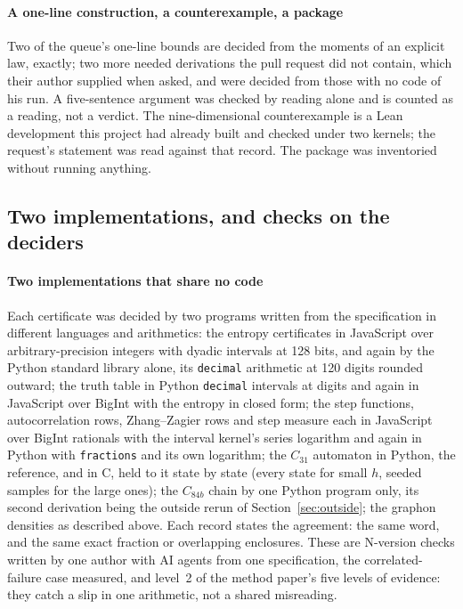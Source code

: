 \documentclass[preprint,11pt,authoryear,a4paper]{elsarticle}
\begin{document}
\paragraph{A one-line construction, a counterexample, a package} Two of the queue's one-line bounds are decided from the moments of an explicit law, exactly; two more needed derivations the pull request did not contain, which their author supplied when asked, and were decided from those with no code of his run. A five-sentence argument was checked by reading alone and is counted as a reading, not a verdict. The nine-dimensional counterexample is a Lean development this project had already built and checked under two kernels; the request's statement was read against that record. The package was inventoried without running anything.

\subsection{Two implementations, and checks on the deciders}\label{sec:deciders}

\paragraph{Two implementations that share no code} Each certificate was decided by two programs written from the specification in different languages and arithmetics: the entropy certificates in JavaScript over arbitrary-precision integers with dyadic intervals at 128 bits, and again by the Python standard library alone, its \texttt{decimal} arithmetic at 120 digits rounded outward; the truth table in Python \texttt{decimal} intervals at \MtFeiPyDigits{} digits and again in JavaScript over BigInt with the entropy in closed form; the step functions, autocorrelation rows, Zhang--Zagier rows and step measure each in JavaScript over BigInt rationals with the interval kernel's series logarithm and again in Python with \texttt{fractions} and its own logarithm; the $C_{31}$ automaton in Python, the reference, and in C, held to it state by state (every state for small $h$, seeded samples for the large ones); the $C_{84b}$ chain by one Python program only, its second derivation being the outside rerun of Section~\ref{sec:outside}; the graphon densities as described above. Each record states the agreement: the same word, and the same exact fraction or overlapping enclosures. These are N-version checks written by one author with AI agents from one specification, the correlated-failure case \citet{KnightLeveson86} measured, and level~2 of the method paper's five levels of evidence: they catch a slip in one arithmetic, not a shared misreading.
\end{document}
